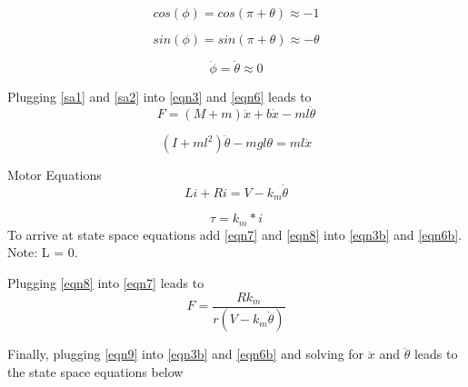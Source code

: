 \documentclass{article}
\begin{document}
\begin{equation} 
\label{sa1}
cos(\phi) = cos(\pi + \theta) \approx -1
\end{equation}

\begin{equation} 
\label{sa2}
sin(\phi) = sin(\pi + \theta) \approx -\theta
\end{equation}

\begin{equation} 
\label{sa3}
\dot{\phi} = \dot{\theta} \approx 0
\end{equation}

Plugging \ref{sa1} and \ref{sa2} into \ref{eqn3} and \ref{eqn6} leads to
\begin{equation} 
\label{eqn3b}
F = (M+m)\ddot{x}+b\dot{x} -m l \ddot{\theta}
\end{equation}

\begin{equation} 
\label{eqn6b}
(I+m l^2)\ddot{\theta} - m g l\theta = m l \ddot{x}
\end{equation}

Motor Equations
\begin{equation} 
\label{eqn7}
L i + R i = V - k_m\dot{\theta}
\end{equation}

\begin{equation} 
\label{eqn8}
\tau = k_m*i
\end{equation}
To arrive at state space equations add \ref{eqn7} and \ref{eqn8} into \ref{eqn3b} and \ref{eqn6b}. Note: L = 0.

Plugging \ref{eqn8} into \ref{eqn7} leads to 
\begin{equation} 
\label{eqn9}
F = \frac{R k_m}{r(V-k_m\dot{\theta})}
\end{equation}

Finally, plugging \ref{eqn9} into \ref{eqn3b} and \ref{eqn6b} and solving for $\ddot{x}$ and $\ddot{\theta}$ leads to the state space equations below
\end{document}
